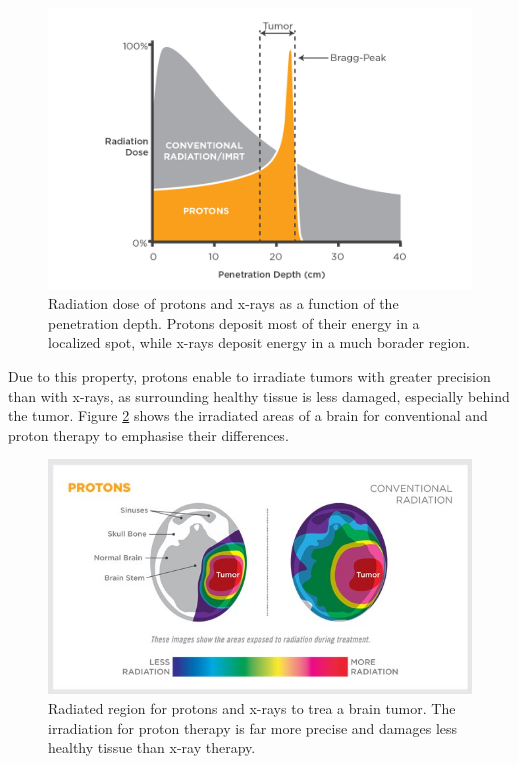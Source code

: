 \begin{figure}
  \centering
  \includegraphics[height=0.6\textwidth]{images/bragg.png}
  \caption{Radiation dose of protons and x-rays as a function of the penetration depth. Protons deposit most of their energy in a localized spot, while
  x-rays deposit energy in a much borader region.}
  \label{fig:bragg}
\end{figure}
Due to this property, protons enable to irradiate tumors with greater precision than with
x-rays, as surrounding healthy tissue is less damaged, especially behind the tumor. Figure \ref{fig:risk} shows the irradiated areas of a brain for conventional and
proton therapy to emphasise their differences.

\begin{figure}
  \centering
  \includegraphics[height=0.5\textwidth]{images/risk.png}
  \caption{Radiated region for protons and x-rays to trea a brain tumor. The irradiation for proton therapy is far more precise and damages less healthy tissue than
  x-ray therapy.}
  \label{fig:risk}
\end{figure}


